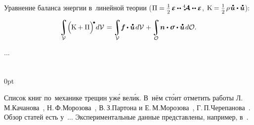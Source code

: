 \begin{otherlanguage}{russian}

Уравнение баланса энергии в~линейной теории (${\potentialenergydensity = \smash{\smalldisplaystyleonehalf} \hspace{.25ex} \infinitesimaldeformation \hspace{-0.1ex} \dotdotp \stiffnesstensor \dotdotp \infinitesimaldeformation}$, ${\kineticenergydensity = \smash{\smalldisplaystyleonehalf} \hspace{.25ex} \rho \hspace{.2ex} \mathdotabove{\bm{u}} \dotp \mathdotabove{\bm{u}}}$):

\nopagebreak\vspace{-0.1em}\begin{equation}
\integral\displaylimits_{\mathcal{V}} \hspace{-0.42ex} \left(^{\mathstrut} \hspace{-0.2ex} \kineticenergydensity + \potentialenergydensity \right)^{\hspace{-0.12em}\tikz[baseline=-0.2ex] \draw[black, fill=black] (0,0) circle (.28ex);} \hspace{-0.25ex} d\mathcal{V} \hspace{.2ex}
= \hspace{-0.1ex}
\integral\displaylimits_{\mathcal{V}} \hspace{-0.5ex} \bm{f} \hspace{-0.1ex} \dotp \mathdotabove{\bm{u}} \hspace{.25ex} d\mathcal{V} \hspace{.16ex}
+ \hspace{-0.1ex}
\integral\displaylimits_{\mathcal{O}} \hspace{-0.32ex} \bm{n} \dotp \linearstress \dotp \mathdotabove{\bm{u}} \hspace{.25ex} d\mathcal{O} .
\end{equation}

...



\end{otherlanguage}

\section*{\small \wordforbibliography}

\begin{changemargin}{\parindent}{0pt}
\fontsize{10}{12}\selectfont

\begin{otherlanguage}{russian}

Список книг по~механике трещин уж\'{е} вел\'{и}к. В~нём ст\'{о}ит отметить работы Л.\,М.\;Качанова~\cite{kachanov-fracturemechanics}, Н.\,Ф.\;Морозова~\cite{morozov-fractures}, В.\,З.\;Партона и Е.\,М.\;Морозова~\cite{parton.morozov-destructionofelastoplastic}, Г.\,П.\;Черепанова~\cite{cherepanov-fragilefracture}. Обзор статей есть у~... Экспериментальные данные представлены, например, в~\cite{kerstein.klyushnikov.lomakin.shesterikov-experimentalfracturemechanics}.

\end{otherlanguage}

\end{changemargin}
